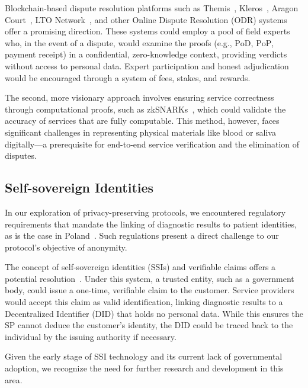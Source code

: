 \documentclass[pdftex,twocolumn,epjc3]{svjour3}
\begin{document}
{Blockchain-based dispute resolution platforms such as Themis~\cite{mengThemisDecentralizedEscrow2019}, Kleros~\cite{bergollaKlerosSociolegalCase2022, gudkovCrowdArbitrationBlockchain2020}, Aragon Court~\cite{aragonDecentralizedDisputeResolution}, LTO Network~\cite{ltonetworkNextGenBlockchainB2B}, and other Online Dispute Resolution (ODR) systems~\cite{allenGovernanceBlockchainDispute2019} offer a promising direction. These systems could employ a pool of field experts who, in the event of a dispute, would examine the proofs (e.g., $\mathrm{PoD}$, $\mathrm{PoP}$, payment $\mathrm{receipt}$) in a confidential, zero-knowledge context, providing verdicts without access to personal data. Expert participation and honest adjudication would be encouraged through a system of fees, stakes, and rewards.

The second, more visionary approach involves ensuring service correctness through computational proofs, such as zkSNARKs~\cite{ben-sassonSNARKsVerifyingProgram2013}, which could validate the accuracy of services that are fully computable. This method, however, faces significant challenges in representing physical materials like blood or saliva digitally—a prerequisite for end-to-end service verification and the elimination of disputes.

\subsection{Self-sovereign Identities}
In our exploration of privacy-preserving protocols, we encountered regulatory requirements that mandate the linking of diagnostic results to patient identities, as is the case in Poland~\cite{ministerstwozdrowiaRegulationMinisterHealth2006}. Such regulations present a direct challenge to our protocol's objective of anonymity.

The concept of self-sovereign identities (SSIs) and verifiable claims offers a potential resolution~\cite{muhleSurveyEssentialComponents2018}. Under this system, a trusted entity, such as a government body, could issue a one-time, verifiable claim to the customer. Service providers would accept this claim as valid identification, linking diagnostic results to a Decentralized Identifier (DID) that holds no personal data. While this ensures the SP cannot deduce the customer's identity, the DID could be traced back to the individual by the issuing authority if necessary.

Given the early stage of SSI technology and its current lack of governmental adoption, we recognize the need for further research and development in this area.

}
\end{document}

